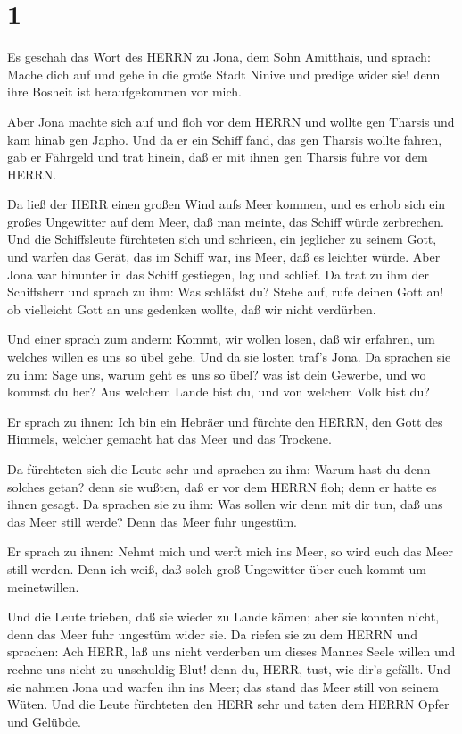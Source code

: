 \hypertarget{section}{%
\section{1}\label{section}}

 Es geschah das Wort des HERRN zu Jona, dem Sohn Amitthais,
und sprach:  Mache dich auf und gehe in die große Stadt
Ninive und predige wider sie! denn ihre Bosheit ist heraufgekommen vor
mich.

 Aber Jona machte sich auf und floh vor dem HERRN und wollte
gen Tharsis und kam hinab gen Japho. Und da er ein Schiff fand, das gen
Tharsis wollte fahren, gab er Fährgeld und trat hinein, daß er mit ihnen
gen Tharsis führe vor dem HERRN.

 Da ließ der HERR einen großen Wind aufs Meer kommen, und es
erhob sich ein großes Ungewitter auf dem Meer, daß man meinte, das
Schiff würde zerbrechen.  Und die Schiffsleute fürchteten
sich und schrieen, ein jeglicher zu seinem Gott, und warfen das Gerät,
das im Schiff war, ins Meer, daß es leichter würde. Aber Jona war
hinunter in das Schiff gestiegen, lag und schlief.  Da trat
zu ihm der Schiffsherr und sprach zu ihm: Was schläfst du? Stehe auf,
rufe deinen Gott an! ob vielleicht Gott an uns gedenken wollte, daß wir
nicht verdürben.

 Und einer sprach zum andern: Kommt, wir wollen losen, daß
wir erfahren, um welches willen es uns so übel gehe. Und da sie losten
traf's Jona.  Da sprachen sie zu ihm: Sage uns, warum geht
es uns so übel? was ist dein Gewerbe, und wo kommst du her? Aus welchem
Lande bist du, und von welchem Volk bist du?

 Er sprach zu ihnen: Ich bin ein Hebräer und fürchte den
HERRN, den Gott des Himmels, welcher gemacht hat das Meer und das
Trockene.

 Da fürchteten sich die Leute sehr und sprachen zu ihm:
Warum hast du denn solches getan? denn sie wußten, daß er vor dem HERRN
floh; denn er hatte es ihnen gesagt.  Da sprachen sie zu
ihm: Was sollen wir denn mit dir tun, daß uns das Meer still werde? Denn
das Meer fuhr ungestüm.

 Er sprach zu ihnen: Nehmt mich und werft mich ins Meer, so
wird euch das Meer still werden. Denn ich weiß, daß solch groß
Ungewitter über euch kommt um meinetwillen.

 Und die Leute trieben, daß sie wieder zu Lande kämen; aber
sie konnten nicht, denn das Meer fuhr ungestüm wider sie. 
Da riefen sie zu dem HERRN und sprachen: Ach HERR, laß uns nicht
verderben um dieses Mannes Seele willen und rechne uns nicht zu
unschuldig Blut! denn du, HERR, tust, wie dir's gefällt. 
Und sie nahmen Jona und warfen ihn ins Meer; das stand das Meer still
von seinem Wüten.  Und die Leute fürchteten den HERR sehr
und taten dem HERRN Opfer und Gelübde.

